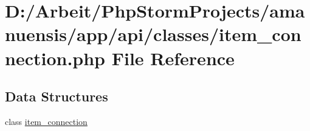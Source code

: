 \hypertarget{a00063}{}\section{D\+:/\+Arbeit/\+Php\+Storm\+Projects/amanuensis/app/api/classes/item\+\_\+connection.php File Reference}
\label{a00063}
\subsection*{Data Structures}
\begin{DoxyCompactItemize}
\item 
class \hyperlink{a00027}{item\+\_\+connection}
\end{DoxyCompactItemize}
